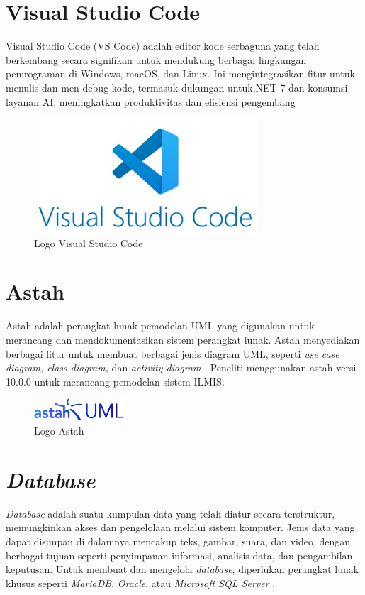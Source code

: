 \section{Visual Studio Code}
Visual Studio Code (VS Code) adalah editor kode serbaguna yang telah berkembang secara signifikan untuk mendukung berbagai lingkungan pemrograman di Windows, macOS, dan Linux. Ini mengintegrasikan fitur untuk menulis dan men-debug kode, termasuk dukungan untuk.NET 7 dan konsumsi layanan AI, meningkatkan produktivitas dan efisiensi pengembang \cite{bree2016using}

\begin{figure}
	\centering
	\includegraphics[width=0.30\linewidth]{konten//gambar/logo-vs-code.png}
	\caption{Logo Visual Studio Code}
	\label{fig:enter-label}
\end{figure}

\section{Astah}
Astah adalah perangkat lunak pemodelan UML yang digunakan untuk merancang dan mendokumentasikan sistem perangkat lunak. Astah menyediakan berbagai fitur untuk membuat berbagai jenis diagram UML, seperti \textit{use case diagram, class diagram,} dan \textit{activity diagram} \cite{hayati2021sistem}. Peneliti menggunakan astah versi 10.0.0 untuk merancang pemodelan sistem ILMIS.
\begin{figure}
	\centering
	\includegraphics[width=0.3\textwidth]{konten/gambar/astah.png}
	\caption{Logo Astah}
	\label{LogoAstah}
\end{figure}

\section{\textit{Database}}
\textit{Database} adalah suatu kumpulan data yang telah diatur secara terstruktur, memungkinkan akses dan pengelolaan melalui sistem komputer. Jenis data yang dapat disimpan di dalamnya mencakup teks, gambar, suara, dan video, dengan berbagai tujuan seperti penyimpanan informasi, analisis data, dan pengambilan keputusan. Untuk membuat dan mengelola \textit{database}, diperlukan perangkat lunak khusus seperti \textit{MariaDB}, \textit{Oracle}, atau \textit{Microsoft SQL Server} \cite{Cowls2021ADB}.

